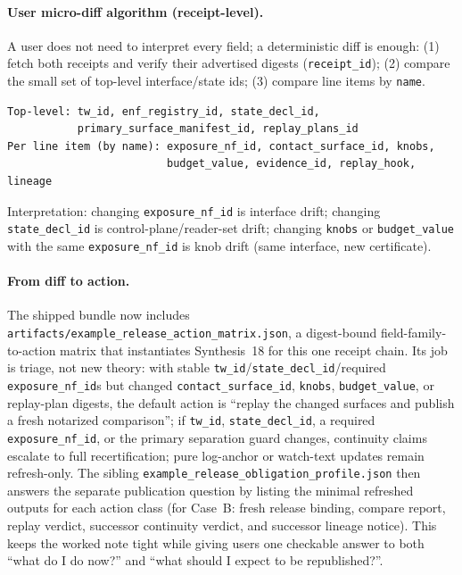 \documentclass[11pt]{article}
\begin{document}
\paragraph{User micro-diff algorithm (receipt-level).}
A user does not need to interpret every field; a deterministic diff is enough:
(1) fetch both receipts and verify their advertised digests (\texttt{receipt\_id});
(2) compare the small set of top-level interface/state ids;
(3) compare line items by \texttt{name}.
\begin{verbatim}
Top-level: tw_id, enf_registry_id, state_decl_id,
           primary_surface_manifest_id, replay_plans_id
Per line item (by name): exposure_nf_id, contact_surface_id, knobs,
                         budget_value, evidence_id, replay_hook, lineage
\end{verbatim}
Interpretation: changing \texttt{exposure\_nf\_id} is interface drift; changing \texttt{state\_decl\_id} is control-plane/reader-set drift; changing \texttt{knobs} or \texttt{budget\_value} with the same \texttt{exposure\_nf\_id} is knob drift (same interface, new certificate).

\paragraph{From diff to action.}
The shipped bundle now includes \texttt{artifacts/example\_release\_action\_matrix.json}, a digest-bound field-family-to-action matrix that instantiates Synthesis~18 for this one receipt chain.
Its job is triage, not new theory: with stable \texttt{tw\_id}/\texttt{state\_decl\_id}/required \texttt{exposure\_nf\_id}s but changed \texttt{contact\_surface\_id}, \texttt{knobs}, \texttt{budget\_value}, or replay-plan digests, the default action is ``replay the changed surfaces and publish a fresh notarized comparison''; if \texttt{tw\_id}, \texttt{state\_decl\_id}, a required \texttt{exposure\_nf\_id}, or the primary separation guard changes, continuity claims escalate to full recertification; pure log-anchor or watch-text updates remain refresh-only. The sibling \texttt{example\_release\_obligation\_profile.json} then answers the separate publication question by listing the minimal refreshed outputs for each action class (for Case~B: fresh release binding, compare report, replay verdict, successor continuity verdict, and successor lineage notice). This keeps the worked note tight while giving users one checkable answer to both ``what do I do now?'' and ``what should I expect to be republished?''.
\end{document}
